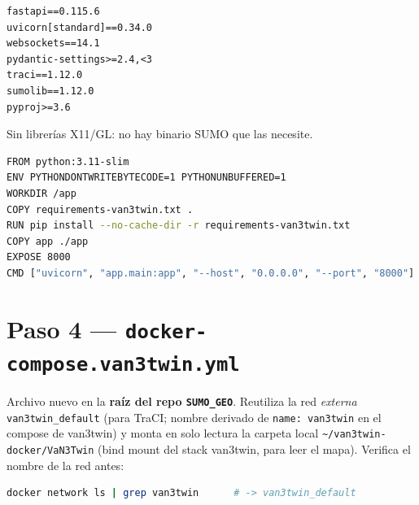 \documentclass[11pt,a4paper]{article}
\begin{document}
\begin{enrepo}
\begin{lstlisting}
fastapi==0.115.6
uvicorn[standard]==0.34.0
websockets==14.1
pydantic-settings>=2.4,<3
traci==1.12.0
sumolib==1.12.0
pyproj>=3.6
\end{lstlisting}
\end{enrepo}

\begin{enrepo}
Sin librerías X11/GL: no hay binario SUMO que las necesite.
\begin{lstlisting}[language=bash]
FROM python:3.11-slim
ENV PYTHONDONTWRITEBYTECODE=1 PYTHONUNBUFFERED=1
WORKDIR /app
COPY requirements-van3twin.txt .
RUN pip install --no-cache-dir -r requirements-van3twin.txt
COPY app ./app
EXPOSE 8000
CMD ["uvicorn", "app.main:app", "--host", "0.0.0.0", "--port", "8000"]
\end{lstlisting}
\end{enrepo}

\section{Paso 4 — \texttt{docker-compose.van3twin.yml}}

Archivo nuevo en la \textbf{raíz del repo \texttt{SUMO\_GEO}}. Reutiliza la red
\emph{externa} \texttt{van3twin\_default} (para TraCI; nombre derivado de
\texttt{name: van3twin} en el compose de van3twin) y monta en solo lectura la carpeta
local \texttt{\textasciitilde/van3twin-docker/VaN3Twin} (bind mount del stack van3twin,
para leer el mapa). Verifica el nombre de la red antes:

\begin{enmac}
\begin{lstlisting}[language=bash]
docker network ls | grep van3twin      # -> van3twin_default
\end{lstlisting}
\end{enmac}
\end{document}

